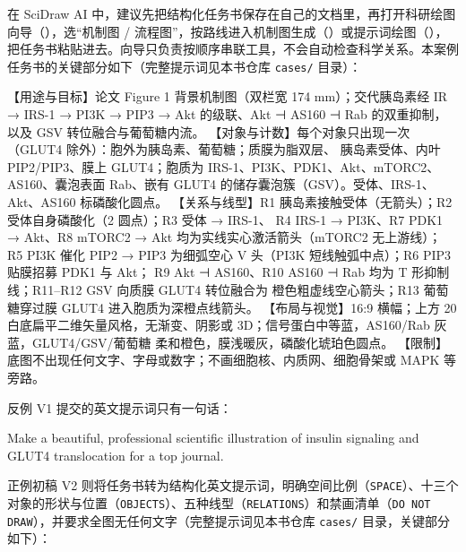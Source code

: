 在 SciDraw AI 中，建议先把结构化任务书保存在自己的文档里，再打开科研绘图向导（），选“机制图 / 流程图”，按路线进入机制图生成（）或提示词绘图（），把任务书粘贴进去。向导只负责按顺序串联工具，不会自动检查科学关系。本案例任务书的关键部分如下（完整提示词见本书仓库 \texttt{cases/} 目录）：

\begin{Prompt}
【用途与目标】论文 Figure 1 背景机制图（双栏宽 174 mm）；交代胰岛素经 IR → IRS-1 →
PI3K → PIP3 → Akt 的级联、Akt ⊣ AS160 ⊣ Rab 的双重抑制，以及 GSV 转位融合与葡萄糖内流。
【对象与计数】每个对象只出现一次（GLUT4 除外）：胞外为胰岛素、葡萄糖；质膜为脂双层、
胰岛素受体、内叶 PIP2/PIP3、膜上 GLUT4；胞质为 IRS-1、PI3K、PDK1、Akt、mTORC2、
AS160、囊泡表面 Rab、嵌有 GLUT4 的储存囊泡簇（GSV）。受体、IRS-1、Akt、AS160 标磷酸化圆点。
【关系与线型】R1 胰岛素接触受体（无箭头）；R2 受体自身磷酸化（2 圆点）；R3 受体 → IRS-1、
R4 IRS-1 → PI3K、R7 PDK1 → Akt、R8 mTORC2 → Akt 均为实线实心激活箭头（mTORC2 无上游线）；
R5 PI3K 催化 PIP2 → PIP3 为细弧空心 V 头（PI3K 短线触弧中点）；R6 PIP3 贴膜招募 PDK1 与 Akt；
R9 Akt ⊣ AS160、R10 AS160 ⊣ Rab 均为 T 形抑制线；R11–R12 GSV 向质膜 GLUT4 转位融合为
橙色粗虚线空心箭头；R13 葡萄糖穿过膜 GLUT4 进入胞质为深橙点线箭头。
【布局与视觉】16:9 横幅；上方 20%
白底扁平二维矢量风格，无渐变、阴影或 3D；信号蛋白中等蓝，AS160/Rab 灰蓝，GLUT4/GSV/葡萄糖
柔和橙色，膜浅暖灰，磷酸化琥珀色圆点。
【限制】底图不出现任何文字、字母或数字；不画细胞核、内质网、细胞骨架或 MAPK 等旁路。
\end{Prompt}

反例 V1 提交的英文提示词只有一句话：

\begin{Prompt}
Make a beautiful, professional scientific illustration of insulin signaling and
GLUT4 translocation for a top journal.
\end{Prompt}

正例初稿 V2 则将任务书转为结构化英文提示词，明确空间比例（\texttt{SPACE}）、十三个对象的形状与位置（\texttt{OBJECTS}）、五种线型（\texttt{RELATIONS}）和禁画清单（\texttt{DO NOT DRAW}），并要求全图无任何文字（完整提示词见本书仓库 \texttt{cases/} 目录，关键部分如下）：

